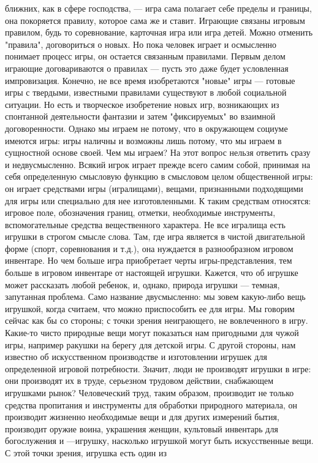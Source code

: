 \documentclass[12pt]{article}
\begin{document}
ближних, как в сфере господства, --- игра сама полагает себе пределы и границы, она покоряется правилу,
которое сама же и ставит. Играющие связаны игровым правилом, будь то соревнование, карточная игра или игра
детей. Можно отменить "правила", договориться о новых. Но пока человек играет и осмысленно понимает
процесс игры, он остается связанным правилами. Первым делом играющие договариваются о правилах --- пусть
это даже будет условленная импровизация. Конечно, не все время изобретаются "новые" игры --- готовые игры с
твердыми,  известными  правилами  существуют  в  любой  социальной  ситуации.  Но  есть  и  творческое
изобретение  новых  игр,  возникающих  из  спонтанной  деятельности  фантазии  и  затем  "фиксируемых"  во 
взаимной договоренности. Однако мы играем не потому, что в окружающем социуме имеются игры: игры
наличны и возможны лишь потому, что мы играем в сущностной основе своей.
Чем мы играем? На этот вопрос нельзя ответить сразу и недвусмысленно. Всякий игрок играет прежде всего
самим собой, принимая на себя определенную смысловую функцию в смысловом целом общественной игры: он
играет средствами игры (игралищами), вещами, признанными подходящими для игры или специально для нее
изготовленными.  К  таким  средствам  относятся:  игровое  поле,  обозначения  границ,  отметки,  необходимые
инструменты, вспомогательные средства вещественного характера. Не все игралища есть игрушки в строгом
смысле слова. Там, где игра является в чистой двигательной форме (спорт, соревнования и т.д.), она нуждается в
разнообразном игровом инвентаре. Но чем больше игра приобретает черты игры-представления, тем больше в
игровом инвентаре от настоящей игрушки. Кажется, что об игрушке может рассказать любой ребенок, и, однако,
природа игрушки --- темная, запутанная проблема. Само название двусмысленно: мы зовем какую-либо вещь
игрушкой, когда считаем, что можно приспособить ее для игры. Мы говорим сейчас как бы со стороны; с точки
зрения  неиграющего,  не  вовлеченного  в  игру.  Какие-то  чисто  природные  вещи  могут  показаться  нам
пригодными для чужой игры, например ракушки на берегу для детской игры. С другой стороны, нам известно
об искусственном производстве и изготовлении игрушек для определенной игровой потребности. Значит, люди
не  производят  игрушки  в  игре:  они  производят  их  в  труде,  серьезном  трудовом  действии,  снабжающем
игрушками  рынок?  Человеческий  труд,  таким  образом,  производит  не  только  средства  пропитания  и
инструменты для обработки природного материала, он производит жизненно необходимые вещи и для других
измерений бытия, производит оружие воина, украшения женщин, культовый инвентарь для богослужения и ---игрушку, насколько игрушкой могут быть искусственные вещи. С этой точки зрения, игрушка есть один из
\end{document}
